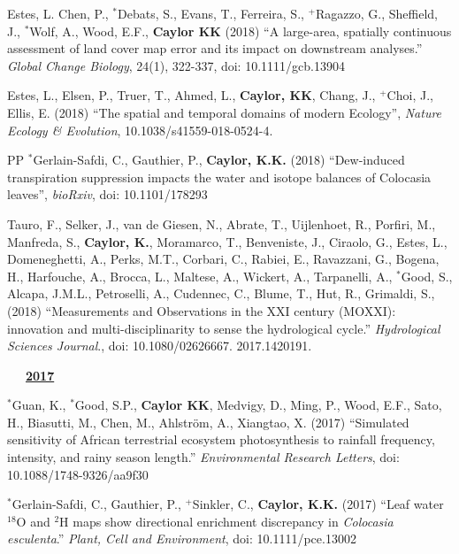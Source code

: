 \documentclass[10pt]{report}
\begin{document}
\begin{etaremune}
\item Estes, L. Chen, P.,  $^{*}$Debats, S., Evans, T., Ferreira, S., $^{+}$Ragazzo, G., Sheffield, J., $^{*}$Wolf, A., Wood, E.F.,  \textbf{Caylor KK} (2018) ``A large-area, spatially continuous assessment of land cover map error and its impact on downstream analyses.'' {\em Global Change Biology}, 24(1), 322-337, doi: 10.1111/gcb.13904

\item Estes, L., Elsen, P., Truer, T., Ahmed, L., \textbf{Caylor, KK}, Chang, J., $^{+}$Choi, J., Ellis, E. (2018) ``The spatial and temporal domains of modern Ecology'', {\em Nature Ecology \& Evolution}, 10.1038/s41559-018-0524-4.

\item [PP] $^{*}$Gerlain-Safdi, C., Gauthier, P.,  \textbf{Caylor, K.K.} (2018) ``Dew-induced transpiration suppression impacts the water and isotope balances of Colocasia leaves'', {\em bioRxiv}, doi: 10.1101/178293

\item Tauro, F., Selker, J., van de Giesen, N., Abrate, T., Uijlenhoet, R., Porfiri, M., Manfreda, S., \textbf{Caylor, K.}, Moramarco, T., Benveniste, J., Ciraolo, G., Estes, L., Domeneghetti, A., Perks, M.T., Corbari, C., Rabiei, E., Ravazzani, G., Bogena, H., Harfouche, A., Brocca, L., Maltese, A., Wickert, A., Tarpanelli, A., $^{*}$Good, S., Alcapa, J.M.L., Petroselli, A., Cudennec, C., Blume, T., Hut, R., Grimaldi, S., (2018) ``Measurements and Observations in the XXI century (MOXXI): innovation and multi-disciplinarity to sense the hydrological cycle.'' {\em Hydrological Sciences Journal}., doi: 10.1080/02626667. 2017.1420191.


\mbox{\ \ \ \underline{\textbf{2017}}}

\item  $^{*}$Guan, K.,  $^{*}$Good, S.P.,  \textbf{Caylor KK}, Medvigy, D., Ming, P., Wood, E.F., Sato, H., Biasutti, M., Chen, M., Ahlstr{\"o}m, A., Xiangtao, X. (2017) ``Simulated sensitivity of African terrestrial ecosystem photosynthesis to rainfall frequency, intensity, and rainy season length.'' {\em Environmental Research Letters}, doi: 10.1088/1748-9326/aa9f30

\item $^{*}$Gerlain-Safdi, C., Gauthier, P.,  $^{+}$Sinkler, C.,  \textbf{Caylor, K.K.} (2017) ``Leaf water $^{18}$O and $^{2}$H maps show directional enrichment discrepancy in {\em Colocasia esculenta}.'' {\em Plant, Cell and Environment}, doi: 10.1111/pce.13002


\end{etaremune}
\end{document}
